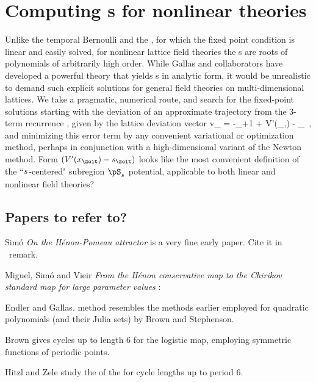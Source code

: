 \section{Computing {\lattstate}s for nonlinear theories}
\label{s:nonlinLattStates}

Unlike the {temporal Bernoulli}  and the
{\templatt} , for which the {\lattstate} fixed
point condition 
is linear and easily solved, for
nonlinear lattice field theories the {\lattstate}s are roots of
polynomials of arbitrarily high order. While Gallas and collaborators%
have developed a powerful theory that yields {\HenonMap} {\po}s in
analytic form, it would be unrealistic to demand such explicit solutions for
general field theories on multi-dimensional lattices. We take a
pragmatic, numerical route, and search for the fixed-point solutions
starting with the deviation of an approximate trajectory from the 3-term
recurrence , given by the lattice deviation vector
\beq
v_{\zeit} = -\ssp_{\zeit+1} + V'(\ssp_{\zeit},\Ssym{\zeit}) - \ssp_{}
\,,
and minimizing this error term by any convenient variational or
optimization method, perhaps in conjunction with a high-dimensional
variant of the Newton method.
     {
Form $(V'(\ssp_{\zeit})-\Ssym{\zeit})$ looks like the most convenient
definition of the ``${s_{}}$-centered" subregion $\pS_\Ssym{}$ potential,
applicable to both linear and nonlinear field theories?
    }



\subsection{Papers to refer to?}

Sim{\'o} {\em On the {H{\'e}non-Pomeau} attractor}
is a very fine early paper. Cite it in \Henon\ remark.

Miguel, Sim{\'{o}} and Vieir {\em From the {H{\'{e}}non}
conservative map to the {Chirikov} standard map for large parameter
values} :

Endler and Gallas.
method resembles the methods
earlier employed for quadratic polynomials (and their Julia sets) by
Brown
and Stephenson.

Brown gives cycles up to length 6 for the logistic map,
employing symmetric functions of periodic points.

Hitzl and Zele
study the of the {\HenonMap} for cycle lengths  up to period  6.

